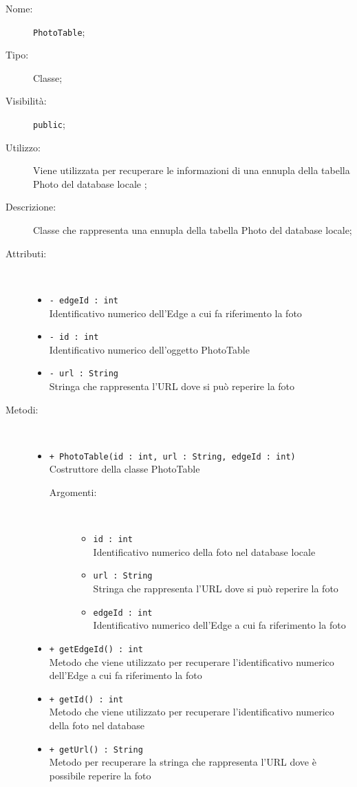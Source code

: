 \documentclass[../DefinizioneDiProdotto.tex]{subfiles}
\begin{document}
\begin{description}
	\item[Nome:] \texttt{PhotoTable};
	\item[Tipo:] Classe;
	\item[Visibilità:] \texttt{public};
	\item[Utilizzo:] Viene utilizzata per recuperare le informazioni di una ennupla della tabella Photo del database locale ;
	\item[Descrizione:] Classe che rappresenta una ennupla della tabella Photo del database locale;
	\item[Attributi:] \
	\begin{itemize}
		\item \texttt{- edgeId : int}\\
		Identificativo numerico dell'Edge a cui fa riferimento la foto
		
		\item \texttt{- id : int}\\
		Identificativo numerico dell'oggetto PhotoTable
		
		\item \texttt{- url : String}\\
		Stringa che rappresenta l'URL dove si può reperire la foto
		
	\end{itemize}
	\item[Metodi:] \
	\begin{itemize}
		\item \texttt{+ PhotoTable(id : int, url : String, edgeId : int)}\\
		Costruttore della classe PhotoTable
		\begin{description}
			\item[Argomenti:] \
			\begin{itemize}
				\item \texttt{id : int}\\
				Identificativo numerico della foto nel database locale\item \texttt{url : String}\\
				Stringa che rappresenta l'URL dove si può reperire la foto\item \texttt{edgeId : int}\\
				Identificativo numerico dell'Edge a cui fa riferimento la foto\end{itemize}
		\end{description}
		\item \texttt{+ getEdgeId() : int}\\
		Metodo che viene utilizzato per recuperare l'identificativo numerico dell'Edge a cui fa riferimento la foto
		\item \texttt{+ getId() : int}\\
		Metodo che viene utilizzato per recuperare l'identificativo numerico della foto nel database
		\item \texttt{+ getUrl() : String}\\
		Metodo per recuperare la stringa che rappresenta l'URL dove è possibile reperire la foto 
	\end{itemize}
\end{description}
\end{document}

